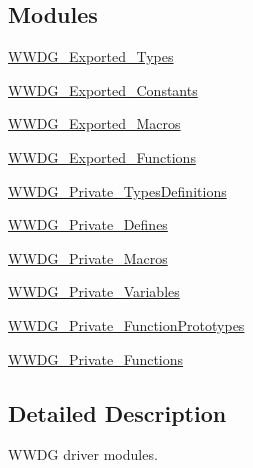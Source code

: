 \subsection*{Modules}
\begin{DoxyCompactItemize}
\item 
\hyperlink{group___w_w_d_g___exported___types}{W\+W\+D\+G\+\_\+\+Exported\+\_\+\+Types}
\item 
\hyperlink{group___w_w_d_g___exported___constants}{W\+W\+D\+G\+\_\+\+Exported\+\_\+\+Constants}
\item 
\hyperlink{group___w_w_d_g___exported___macros}{W\+W\+D\+G\+\_\+\+Exported\+\_\+\+Macros}
\item 
\hyperlink{group___w_w_d_g___exported___functions}{W\+W\+D\+G\+\_\+\+Exported\+\_\+\+Functions}
\item 
\hyperlink{group___w_w_d_g___private___types_definitions}{W\+W\+D\+G\+\_\+\+Private\+\_\+\+Types\+Definitions}
\item 
\hyperlink{group___w_w_d_g___private___defines}{W\+W\+D\+G\+\_\+\+Private\+\_\+\+Defines}
\item 
\hyperlink{group___w_w_d_g___private___macros}{W\+W\+D\+G\+\_\+\+Private\+\_\+\+Macros}
\item 
\hyperlink{group___w_w_d_g___private___variables}{W\+W\+D\+G\+\_\+\+Private\+\_\+\+Variables}
\item 
\hyperlink{group___w_w_d_g___private___function_prototypes}{W\+W\+D\+G\+\_\+\+Private\+\_\+\+Function\+Prototypes}
\item 
\hyperlink{group___w_w_d_g___private___functions}{W\+W\+D\+G\+\_\+\+Private\+\_\+\+Functions}
\end{DoxyCompactItemize}


\subsection{Detailed Description}
W\+W\+DG driver modules. 

